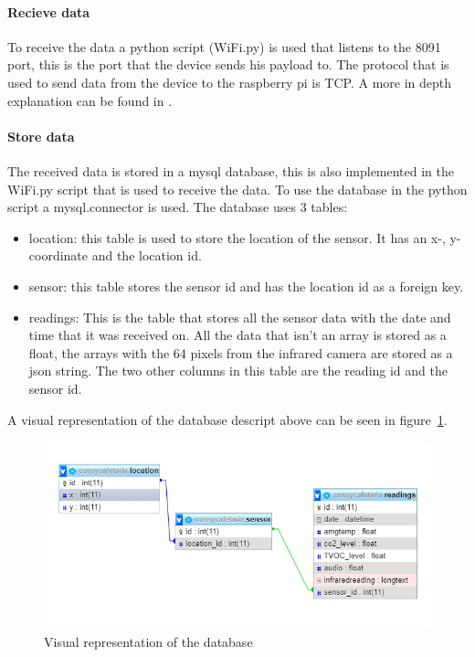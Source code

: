 \documentclass[11pt,a4paper]{article}
\begin{document}
\paragraph{Recieve data}
To receive the data a python script (WiFi.py) is used that listens to the 8091 port, this is the port that the device sends his payload to.
The protocol that is used to send data from the device to the raspberry pi is TCP. A more in depth explanation can be found in .

\paragraph{Store data}
The received data is stored in a mysql database, this is also implemented in the WiFi.py script that is used to receive the data.
To use the database in the python script a mysql.connector is used.
The database uses 3 tables: 
\begin{itemize}
	\item location: this table is used to store the location of the sensor. It has an x-, y-coordinate and the location id.
	\item sensor: this table stores the sensor id  and has the location id as a foreign key.
	\item readings: This is the table that stores all the sensor data with the date and time that it was received on. 
					All the data that isn't an array is stored as a float, the arrays with the 64 pixels from the infrared camera are stored as a json string.
					The two other columns in this table are the reading id and the sensor id.  
\end{itemize}
A visual representation of the database descript above can be seen in figure~\ref{fig:db_des}.

\begin{figure}[H]
	\centering
	\includegraphics[width=1.0\linewidth]{databaseDesign.png}
	\caption{Visual representation of the database}
	\label{fig:db_des}
\end{figure}
\end{document}
